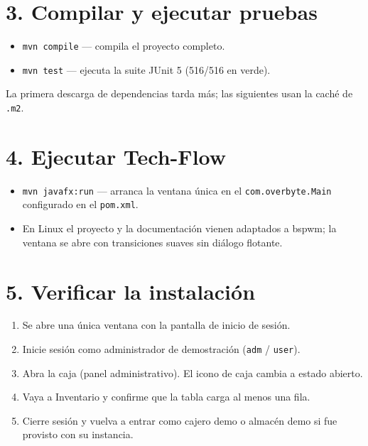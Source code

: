 \documentclass[12pt,a4paper]{report}
\begin{document}
\section{3. Compilar y ejecutar pruebas}
\begin{itemize}
\item \texttt{mvn compile} — compila el proyecto completo.
\item \texttt{mvn test} — ejecuta la suite JUnit 5 (516/516 en verde).
\end{itemize}
La primera descarga de dependencias tarda más; las siguientes usan la caché de \texttt{.m2}.

\section{4. Ejecutar Tech-Flow}
\begin{itemize}
\item \texttt{mvn javafx:run} — arranca la ventana única en el \texttt{com.overbyte.Main} configurado en el \texttt{pom.xml}.
\item En Linux el proyecto y la documentación vienen adaptados a bspwm; la ventana se abre con transiciones suaves sin diálogo flotante.
\end{itemize}

\section{5. Verificar la instalación}
\begin{enumerate}
\item Se abre una única ventana con la pantalla de inicio de sesión.
\item Inicie sesión como administrador de demostración (\texttt{adm} / \texttt{user}).
\item Abra la caja (panel administrativo). El icono de caja cambia a estado abierto.
\item Vaya a Inventario y confirme que la tabla carga al menos una fila.
\item Cierre sesión y vuelva a entrar como cajero demo o almacén demo si fue provisto con su instancia.
\end{enumerate}
\end{document}

